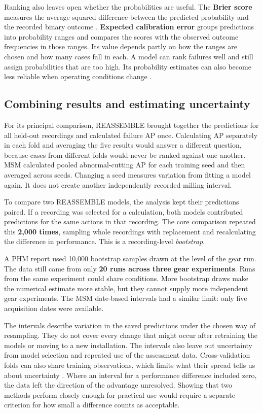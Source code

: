 Ranking also leaves open whether the probabilities are useful. The \textbf{Brier score}
measures the average squared difference between the predicted probability and the
recorded binary outcome \parencite{P055}. \textbf{Expected calibration error} groups
predictions into probability ranges and compares the scores with the observed outcome
frequencies in those ranges. Its value depends partly on how the ranges are chosen and
how many cases fall in each. A model can rank failures well and still assign
probabilities that are too high. Its probability estimates can also become less reliable
when operating conditions change \parencite{P008}.

\subsection{Combining results and estimating uncertainty}

For its principal comparison, REASSEMBLE brought together the predictions for all
held-out recordings and calculated failure AP once. Calculating AP separately in each
fold and averaging the five results would answer a different question, because cases
from different folds would never be ranked against one another. MSM calculated pooled
abnormal-cutting AP for each training seed and then averaged across seeds. Changing a
seed measures variation from fitting a model again. It does not create another
independently recorded milling interval.

To compare two REASSEMBLE models, the analysis kept their predictions paired. If a
recording was selected for a calculation, both models contributed predictions for the
same actions in that recording. The core comparison repeated this \textbf{2,000 times},
sampling whole recordings with replacement and recalculating the difference in
performance. This is a recording-level \emph{bootstrap}.

A PHM report used 10,000 bootstrap samples drawn at the level of the gear run. The data
still came from only \textbf{20 runs across three gear experiments}. Runs from the same
experiment could share conditions. More bootstrap draws make the numerical estimate more
stable, but they cannot supply more independent gear experiments. The MSM date-based
intervals had a similar limit: only five acquisition dates were available.

The intervals describe variation in the saved predictions under the chosen way of
resampling. They do not cover every change that might occur after retraining the models
or moving to a new installation. The intervals also leave out uncertainty from model
selection and repeated use of the assessment data. Cross-validation folds can also share
training observations, which limits what their spread tells us about uncertainty
\parencite{Bengio2004CVVariance}. Where an interval for a performance difference
included zero, the data left the direction of the advantage unresolved. Showing that two
methods perform closely enough for practical use would require a separate criterion for
how small a difference counts as acceptable.

